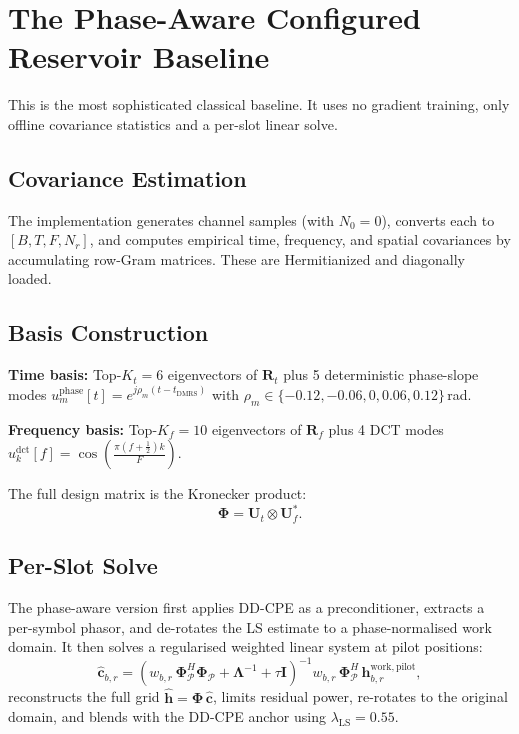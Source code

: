 \documentclass[11pt,a4paper]{article}
\newcommand{\bh}{\mathbf{h}}
\newcommand{\bc}{\mathbf{c}}
\newcommand{\bU}{\mathbf{U}}
\newcommand{\bPhi}{\boldsymbol{\Phi}}
\newcommand{\bLambda}{\boldsymbol{\Lambda}}
\newcommand{\bR}{\mathbf{R}}
\newcommand{\bI}{\mathbf{I}}
\begin{document}
	\section{The Phase-Aware Configured Reservoir Baseline}
	
	This is the most sophisticated classical baseline.  It uses no gradient training, only offline covariance statistics and a per-slot linear solve.
	
	\subsection{Covariance Estimation}
	
	The implementation generates channel samples (with $N_0 = 0$), converts each to $[B, T, F, N_r]$, and computes empirical time, frequency, and spatial covariances by accumulating row-Gram matrices.  These are Hermitianized and diagonally loaded.
	
	\subsection{Basis Construction}
	
	\textbf{Time basis:} Top-$K_t = 6$ eigenvectors of $\bR_t$ plus 5 deterministic phase-slope modes $u_m^{\mathrm{phase}}[t] = e^{j\rho_m(t - t_{\mathrm{DMRS}})}$ with $\rho_m \in \{-0.12, -0.06, 0, 0.06, 0.12\}$\,rad.
	
	\textbf{Frequency basis:} Top-$K_f = 10$ eigenvectors of $\bR_f$ plus 4 DCT modes $u_k^{\mathrm{dct}}[f] = \cos\!\left(\frac{\pi(f+\frac{1}{2})k}{F}\right)$.
	
	The full design matrix is the Kronecker product:
	\begin{equation}
		\bPhi = \bU_t \otimes \bU_f^*.
	\end{equation}
	
	\subsection{Per-Slot Solve}
	
	The phase-aware version first applies DD-CPE as a preconditioner, extracts a per-symbol phasor, and de-rotates the LS estimate to a phase-normalised work domain.  It then solves a regularised weighted linear system at pilot positions:
	\begin{equation}
		\widehat{\bc}_{b,r} = \left(w_{b,r}\, \bPhi_\mathcal{P}^H \bPhi_\mathcal{P} + \bLambda^{-1} + \tau\bI\right)^{-1} w_{b,r}\, \bPhi_\mathcal{P}^H\, \bh^{\mathrm{work,pilot}}_{b,r},
	\end{equation}
	reconstructs the full grid $\widehat{\bh} = \bPhi\,\widehat{\bc}$, limits residual power, re-rotates to the original domain, and blends with the DD-CPE anchor using $\lambda_{\mathrm{LS}} = 0.55$.
	
\end{document}
